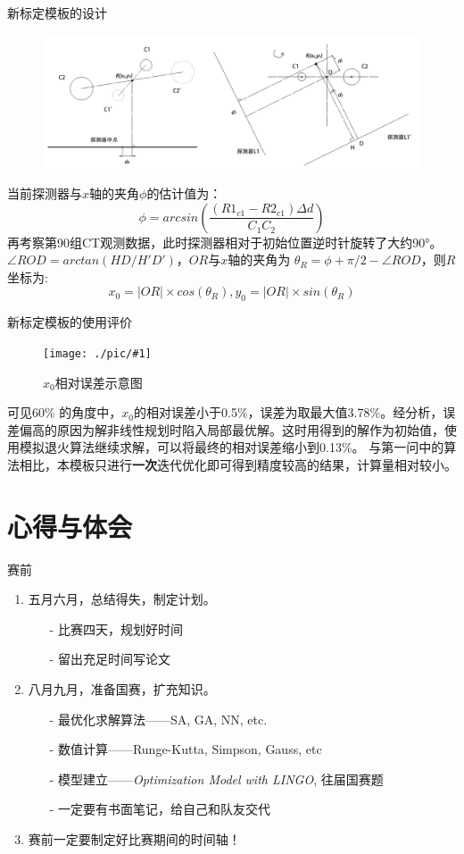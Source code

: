 \documentclass[serif]{beamer} %
\newcommand{\midpic}[2]{  \begin{figure}[H]
\centering
\texttt{[image: ./pic/\#1]}\\
\caption{#2}
\end{figure}}
\begin{document}
\begin{frame}{新标定模板的设计}
	\begin{figure}[H]
		\centering
		\includegraphics[width=\textwidth]{./pic/merge1.png}\\
	\end{figure}
	\small 当前探测器与\(x\)轴的夹角\(\phi\)的估计值为：
	\[ \phi = arcsin\left(  \frac{(R1_{c1} - R2_{c1})\Delta d}{C_1 C_2}   \right)\]
	\small 再考察第90组CT观测数据，此时探测器相对于初始位置逆时针旋转了大约90°。\(\angle ROD = arctan(HD/H'D') \)，\(OR\)与\(x\)轴的夹角为 \( \theta _R = \phi + \pi/2 - \angle ROD \)，则\(R\)坐标为:
	\[x_0 = |OR| \times cos(\theta_R), y_0 = |OR| \times sin(\theta_R) \]
	
\end{frame}

\begin{frame}{新标定模板的使用评价}
	\midpic{Error.png}{\(x_0\)相对误差示意图}
	\small 可见60\% 的角度中，\(x_0\)的相对误差小于0.5\%，误差为取最大值3.78\%。经分析，误差偏高的原因为解非线性规划时陷入局部最优解。这时用得到的解作为初始值，使用模拟退火算法继续求解，可以将最终的相对误差缩小到0.13\%。
	\small 与第一问中的算法相比，本模板只进行\textbf{一次}迭代优化即可得到精度较高的结果，计算量相对较小。
\end{frame}




\section{心得与体会}
\begin{frame}{赛前}
	\begin{enumerate}
	  \item 五月六月，总结得失，制定计划。
		\begin{enumerate}
		  \item[-] 比赛四天，规划好时间
		  \item[-] 留出充足时间写论文
		\end{enumerate}
	  \item 八月九月，准备国赛，扩充知识。
		\begin{enumerate}
		  \item[-] 最优化求解算法——SA, GA, NN, etc.
		  \item[-] 数值计算——Runge-Kutta, Simpson, Gauss, etc
		  \item[-] 模型建立——\emph{Optimization Model with LINGO}, 往届国赛题
		  \item[-] 一定要有书面笔记，给自己和队友交代
		\end{enumerate}
	  \item 赛前一定要制定好比赛期间的时间轴！
	\end{enumerate}
  \end{frame}
\end{document}
